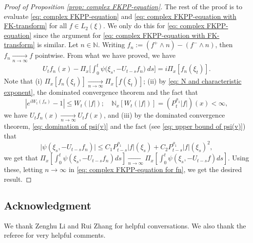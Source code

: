 \documentclass[12pt,a4paper]{amsart}
\theoremstyle{plain}
\theoremstyle{definition}
\numberwithin{equation}{section}
\begin{document}
\begin{proof}[Proof of Proposition \ref{prop: complex FKPP-equation}]
  The rest of the proof is to evaluate \eqref{eq: complex FKPP-equation} and \eqref{eq: complex FKPP-equation with FK-transform} for all $f\in L_2(\xi)$. We only do this for \eqref{eq: complex FKPP-equation} since the argument for \eqref{eq: complex FKPP-equation with FK-transform} is similar.
  Let $n \in \mathbb N$.
  Writing $f_n := (f^+ \wedge n) - (f^- \wedge n)$, then $f_n \xrightarrow[n\to \infty]{} f$ pointwise.
  From what we have proved, we have
  \begin{align}
    \label{eq: complex FKPP-equation for fn}
    U_tf_n(x) - \Pi_{x} \Big[\int_0^t \psi\big(\xi_s, - U_{t-s}f_n\big) ~ds\Big]
    = i \Pi_{x} [f_n(\xi_t)].
  \end{align}
  Note that
  (i) $\Pi_{x}[f_n(\xi_t)] \xrightarrow[n\to \infty]{} \Pi_{x}[f(\xi_t)]$;
  (ii) by \eqref{eq: N and characteristic exponent}, the dominated convergence theorem and the fact that
  \[
     |e^{i W_t(f_n)} - 1| \leq W_t(|f|);
    \quad \mathbb N_x[W_t(|f|)] = (P_t^{\rho_1} |f|)(x) < \infty,
 \]
  we have $U_tf_n(x) \xrightarrow[n\to \infty]{} U_tf(x)$, and (iii) by the dominated convergence theorem, \eqref{eq: domination of psi(v)} and the fact (see \eqref{eq: upper bound of psi(v)}) that
  \[
    \big|\psi(\xi_s,- U_{t-s}f_n)\big|
    \leq C_1 P_{t-s}^{\rho_1}|f|(\xi_s)+C_2 P_{t-s}^{\rho_1}|f|(\xi_s)^2,
  \]
  we get that $\Pi_{x} [\int_0^t \psi(\xi_s,- U_{t-s}f_n)ds] \xrightarrow[n\to \infty]{} \Pi_{x} [\int_0^t \psi(\xi_s,- U_{t-s}f)ds]$.
  Using these, letting $n \to \infty$ in \eqref{eq: complex FKPP-equation for fn}, we get the desired result.
\end{proof}

\subsection*{Acknowledgment}
We thank Zenghu Li and Rui Zhang for helpful conversations.
We also thank the referee for very helpful comments.
\end{document}
